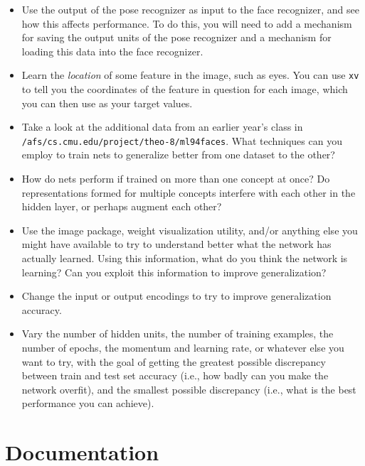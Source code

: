 \begin{itemize}

\item Use the output of the pose recognizer as input to the face
recognizer, and see how this affects performance.  To do this, you will need
to add a mechanism for saving the output units of the pose recognizer and a
mechanism for loading this data into the face recognizer.

\item Learn the {\it location} of some feature in the image, such
as eyes.  You can use {\tt xv} to tell you the coordinates of the feature in
question for each image, which you can then use as your target values.

\item Take a look at the additional data from an earlier year's class in
{\tt /afs/cs.cmu.edu/project/theo-8/ml94faces}.  What techniques can you
employ to train nets to generalize better from one dataset to the other?

\item How do nets perform if trained on more than one concept at once?
Do representations formed for multiple concepts interfere with each other in
the hidden layer, or perhaps augment each other?

\item Use the image package, weight visualization utility, and/or
anything else you might have available to try to understand better what the
network has actually learned.  Using this information, what do you think the
network is learning?  Can you exploit this information to improve
generalization?

\item Change the input or output encodings to try to improve
generalization accuracy.

\item Vary the number of hidden units, the number of training examples,
the number of epochs, the momentum and learning rate, or whatever else you
want to try, with the goal of getting the greatest possible discrepancy
between train and test set accuracy (i.e., how badly can you make the network
overfit), and the smallest possible discrepancy (i.e., what is the best
performance you can achieve).

\end{itemize}

\section{Documentation}
\label{docs}

